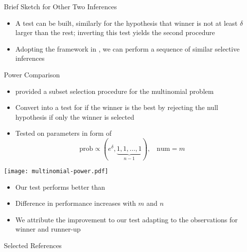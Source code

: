 \documentclass[final]{beamer}
\newlength{\onecolwid}
\begin{document}
\begin{frame}[t]
\begin{columns}[t]
\begin{column}{\onecolwid}

\begin{block}{Brief Sketch for Other Two Inferences}

\begin{itemize}
	\item A test can be built, similarly for the hypothesis that winner is not at least $\delta$ larger than the rest; inverting this test yields the second procedure
	\item Adopting the framework in \citet{Fithian:2015uj}, we can perform a sequence of similar selective inferences
\end{itemize}

\end{block}

\begin{block}{Power Comparison}

\begin{itemize}
\item \citet{Gupta:1967wg} provided a subset selection procedure for the multinomial problem
\item Convert into a test for if the winner is the best by rejecting the null hypothesis if only the winner is selected
\item Tested on parameters in form of
\[
\text{prob} \propto (e^\delta, \underbrace{1, 1, \ldots, 1}_{n - 1}), ~~~~ \text{num} = m
\]
\end{itemize}

\centering
\texttt{[image: multinomial-power.pdf]}

\begin{itemize}
	\item Our test performs better than \citet{Gupta:1967wg}
	\item Difference in performance increases with $m$ and $n$
	\item We attribute the improvement to our test adapting to the observations for winner and runner-up
\end{itemize}

\end{block}

\begin{block}{Selected References}

\small{


\vspace{0.75in}
}

\end{block}

\end{column}

\end{columns}

\end{frame}
\end{document}
